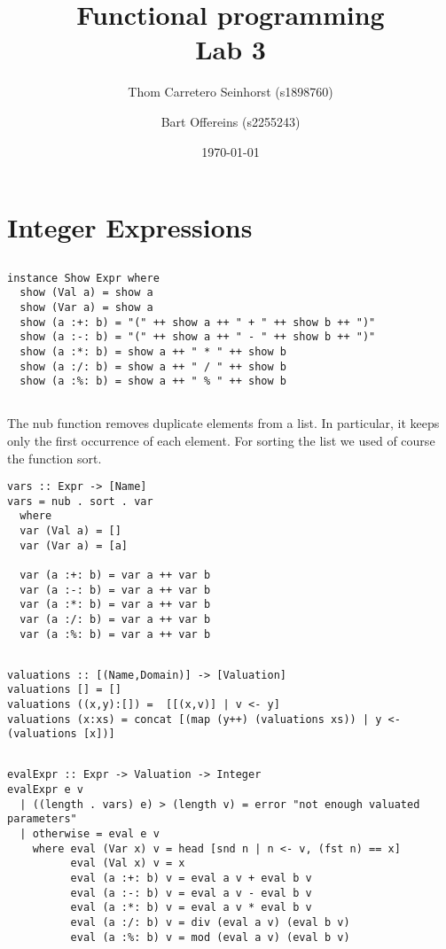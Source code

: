 \documentclass[a4paper,11pt]{article}
\author{Thom Carretero Seinhorst (s1898760) \and Bart Offereins (s2255243)}
\date{\today}
\title{Functional programming \\Lab 3}
\begin{document}
  \maketitle

\section{Integer Expressions}

\subsection{}
\begin{lstlisting}
instance Show Expr where
  show (Val a) = show a
  show (Var a) = show a
  show (a :+: b) = "(" ++ show a ++ " + " ++ show b ++ ")"
  show (a :-: b) = "(" ++ show a ++ " - " ++ show b ++ ")"
  show (a :*: b) = show a ++ " * " ++ show b
  show (a :/: b) = show a ++ " / " ++ show b
  show (a :%: b) = show a ++ " % " ++ show b
\end{lstlisting}

\subsection{}
The nub function removes duplicate elements from a list. In particular, it keeps only the first occurrence of each element. For sorting the list we used of course the function sort. 
\begin{lstlisting}
vars :: Expr -> [Name]
vars = nub . sort . var
  where
  var (Val a) = []
  var (Var a) = [a]

  var (a :+: b) = var a ++ var b
  var (a :-: b) = var a ++ var b
  var (a :*: b) = var a ++ var b
  var (a :/: b) = var a ++ var b
  var (a :%: b) = var a ++ var b
\end{lstlisting}

\subsection{}
\begin{lstlisting}
valuations :: [(Name,Domain)] -> [Valuation]
valuations [] = []
valuations ((x,y):[]) =  [[(x,v)] | v <- y]
valuations (x:xs) = concat [(map (y++) (valuations xs)) | y <- (valuations [x])]
\end{lstlisting}

\subsection{}
\begin{lstlisting}
evalExpr :: Expr -> Valuation -> Integer
evalExpr e v
  | ((length . vars) e) > (length v) = error "not enough valuated parameters"
  | otherwise = eval e v
    where eval (Var x) v = head [snd n | n <- v, (fst n) == x] 
          eval (Val x) v = x
          eval (a :+: b) v = eval a v + eval b v
          eval (a :-: b) v = eval a v - eval b v
          eval (a :*: b) v = eval a v * eval b v
          eval (a :/: b) v = div (eval a v) (eval b v)
          eval (a :%: b) v = mod (eval a v) (eval b v)
\end{lstlisting}
\end{document}
